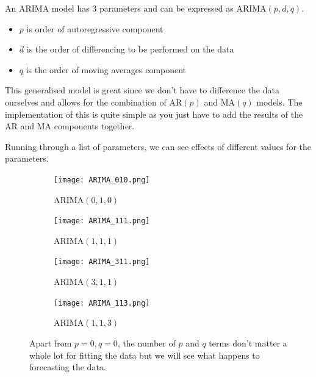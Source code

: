 \documentclass{article}
\begin{document}
  An ARIMA model has 3 parameters and can be expressed as ARIMA$(p,d,q)$.
  \begin{itemize}
    \item $p$ is order of autoregressive component
    \item $d$ is the order of differencing to be performed on the data
    \item $q$ is the order of moving averages component
  \end{itemize}
  This generalised model is great since we don't have to difference the data ourselves and allows for the combination of AR$(p)$ and MA$(q)$ models. The implementation of this is quite simple as you just have to add the results of the AR and MA components together.

  Running through a list of parameters, we can see effects of different values for the parameters.

  \begin{figure}[H]
    \centering
    \captionsetup{justification=centering}
    \begin{subfigure}[b]{0.49\linewidth}
      \texttt{[image: ARIMA\_010.png]}
      \caption{ARIMA$(0, 1, 0)$}
    \end{subfigure}
    \begin{subfigure}[b]{0.49\linewidth}
      \texttt{[image: ARIMA\_111.png]}
      \caption{ARIMA$(1, 1, 1)$}
    \end{subfigure}
    \begin{subfigure}[b]{0.49\linewidth}
      \texttt{[image: ARIMA\_311.png]}
      \caption{ARIMA$(3, 1, 1)$}
    \end{subfigure}
    \begin{subfigure}[b]{0.49\linewidth}
      \texttt{[image: ARIMA\_113.png]}
      \caption{ARIMA$(1, 1, 3)$}
    \end{subfigure}
    \caption{Apart from $p=0, q=0$, the number of $p$ and $q$ terms don't matter a whole lot for fitting the data but we will see what happens to forecasting the data.}
  \end{figure}
\end{document}
